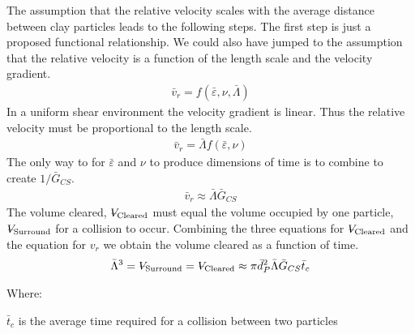 \documentclass[letterpaper,10pt,english]{sphinxmanual}
\begin{document}
The assumption that the relative velocity scales with the average distance between clay particles leads to the following steps. The first step is just a proposed functional relationship. We could also have jumped to the assumption that the relative velocity is a function of the length scale and the velocity gradient.
\begin{equation}\label{equation:Flocculation/Floc_Model:Flocculation/Floc_Model:5}
\begin{split}\bar v_r = f \left( \bar \varepsilon ,\nu ,\bar \Lambda \right)\end{split}
\end{equation}
In a uniform shear environment the velocity gradient is linear. Thus the relative velocity must be proportional to the length scale.
\begin{equation}\label{equation:Flocculation/Floc_Model:Flocculation/Floc_Model:6}
\begin{split}\bar v_r = \bar \Lambda f \left( \bar \varepsilon ,\nu \right)\end{split}
\end{equation}
The only way to for \(\bar \varepsilon\) and \(\nu\) to produce dimensions of time is to combine to create \(1/\bar G_{CS}\).
\begin{equation}\label{equation:Flocculation/Floc_Model:Flocculation/Floc_Model:7}
\begin{split}\bar v_r \approx \bar \Lambda \bar G_{CS}\end{split}
\end{equation}
The volume cleared, \({\rlap{\kern.08em--}V_{\rm{Cleared}}}\) must equal the volume occupied by one particle, \({\rlap{\kern.08em--}V_{\rm{Surround}}}\) for a collision to occur. Combining the three equations for \({\rlap{\kern.08em--}V_{\rm{Cleared}}}\) and the equation for \(v_r\) we obtain the volume cleared as a function of time.
\begin{equation}\label{equation:Flocculation/Floc_Model:Flocculation/Floc_Model:8}
\begin{split}\bar \Lambda^3 = {\rlap{\kern.08em--}V_{\rm{Surround}}} = {\rlap{\kern.08em--}V_{\rm{Cleared}}} \approx \pi \bar d_P^2 \bar \Lambda \bar G_{CS} \bar t_c\end{split}
\end{equation}
\begin{DUlineblock}{0em}
\item[] Where:
\item[] \(\bar t_c\) is the average time required for a collision between two particles
\end{DUlineblock}
\end{document}
